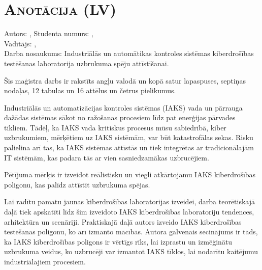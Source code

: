 \chapter*{\textsc{Anotācija (LV)}}

Autors: \me, Studenta numurs: \studentcode, \\
Vadītājs: \supervisortitle \supervisor,  \\
Darba nosaukums: Industriālās un automātikas kontroles sistēmas kiberdrošības testēšanas laboratorija uzbrukuma spēju attīstīšanai.  


Šis maģistra darbs ir rakstīts angļu valodā un kopā satur \pageref*{LastPage} lapaspuses, septiņas nodaļas, 12 tabulas un 16 attēlus un četrus pielikumus. 


Industriālās un automatizācijas kontroles sistēmas (IAKS) vada un pārrauga dažādas sistēmas sākot no ražošanas procesiem līdz pat enerģijas pārvades tīkliem. Tādēļ, ka IAKS vada kritiskus procesus mūsu sabiedrībā, kiber uzbrukumiem, mērķētiem uz IAKS sistēmām, var būt katastrofālas sekas. Risku palielina arī tas, ka IAKS sistēmas attīstās un tiek integrētas ar tradicionālajām IT sistēmām, kas padara tās ar vien sasniedzamākas uzbrucējiem. 

Pētījuma mērķis ir izveidot reālistisku un viegli atkārtojamu IAKS kiberdrošības poligonu, kas palīdz attīstīt uzbrukuma spējas.
 
Lai radītu pamatu jaunas kiberdrošības laboratorijas izveidei, darba teorētiskajā daļā tiek apskatīti līdz šim izveidoto IAKS kiberdrošības laboratoriju tendences, arhitektūra un scenāriji. Praktiskajā daļā autors izveido IAKS kiberdrošības testēšanas poligonu, ko arī izmanto mācībās. Autora galvenais secinājums ir tāds, ka IAKS kiberdrošības poligons ir vērtīgs rīks, lai izprastu un izmēģinātu uzbrukuma veidus, ko uzbrucēji var izmantot IAKS tīklos, lai nodarītu kaitējumu industriālajiem procesiem.



